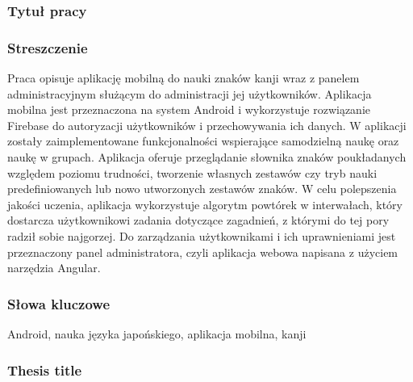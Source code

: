 \documentclass[a4paper,twoside,12pt]{book}
\newcommand{\ksremark}[1]{%
{%
{\color{brickred}{[#1]}}}%
\addcontentsline{rks}{uwagas}{\protect{#1}}%
}
\begin{document}


\cleardoublepage

\rmfamily\normalfont
\pagestyle{empty}



\subsubsection*{Tytuł pracy} 
\Title

\subsubsection*{Streszczenie}  

Praca opisuje aplikację mobilną do nauki znaków kanji wraz z panelem administracyjnym służącym do administracji jej użytkowników. Aplikacja mobilna jest przeznaczona na system Android i wykorzystuje rozwiązanie Firebase do autoryzacji użytkowników i przechowywania ich danych. W aplikacji zostały zaimplementowane funkcjonalności wspierające samodzielną naukę oraz naukę w grupach. Aplikacja oferuje przeglądanie słownika znaków poukładanych względem poziomu trudności, tworzenie własnych zestawów czy tryb nauki predefiniowanych lub nowo utworzonych zestawów znaków. W celu polepszenia jakości uczenia, aplikacja wykorzystuje algorytm powtórek w interwałach, który dostarcza użytkownikowi zadania dotyczące zagadnień, z którymi do tej pory radził sobie najgorzej. Do zarządzania użytkownikami i ich uprawnieniami jest przeznaczony panel administratora, czyli aplikacja webowa napisana z użyciem narzędzia Angular. 

\subsubsection*{Słowa kluczowe} 
Android, nauka języka japońskiego, aplikacja mobilna, kanji

\subsubsection*{Thesis title} 
\begin{otherlanguage}{british}
\TitleAlt
\end{otherlanguage}
\end{document}
